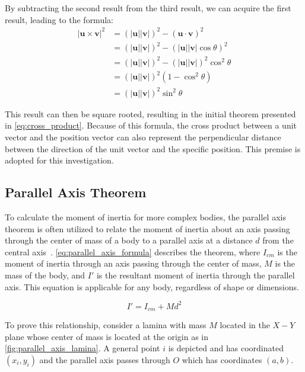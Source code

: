 By subtracting the second result from the third result, we can acquire the first result, leading to the formula:
\begin{align*}
|\bm{u} \times \bm{v}|^2 &= (|\bm{u}||\bm{v}|)^2 - (\bm{u} \cdot \bm{v})^2 \\
&= (|\bm{u}||\bm{v}|)^2 - (|\bm{u}||\bm{v}|\cos{\theta})^2 \\
&= (|\bm{u}||\bm{v}|)^2 - (|\bm{u}||\bm{v}|)^2\cos^2{\theta} \\
&= (|\bm{u}||\bm{v}|)^2(1 - \cos^2{\theta}) \\
&= (|\bm{u}||\bm{v}|)^2\sin^2{\theta}
\end{align*}

This result can then be square rooted, resulting in the initial theorem presented in \cref{eq:cross_product}. Because of this formula, the cross product between a unit vector and the position vector can also represent the perpendicular distance between the direction of the unit vector and the specific position. This premise is adopted for this investigation.

\subsection{Parallel Axis Theorem}

To calculate the moment of inertia for more complex bodies, the parallel axis theorem is often utilized to relate the moment of inertia about an axis passing through the center of mass of a body to a parallel axis at a distance $d$ from the central axis~\parencite{Abdulghany_2017}. \cref{eq:parallel_axis_formula} describes the theorem, where $I_{cm}$ is the moment of inertia through an axis passing through the center of mass, $M$ is the mass of the body, and $I'$ is the resultant moment of inertia through the parallel axis. This equation is applicable for any body, regardless of shape or dimensions.

\begin{equation}
I' = I_{cm} + Md^2
\label{eq:parallel_axis_formula}
\end{equation}

To prove this relationship, consider a lamina with mass $M$ located in the $X-Y$ plane whose center of mass is located at the origin as in \cref{fig:parallel_axis_lamina}. A general point $i$ is depicted and has coordinated $(x_i, y_i)$ and the parallel axis passes through $O$ which has coordinates $(a, b)$.

 

